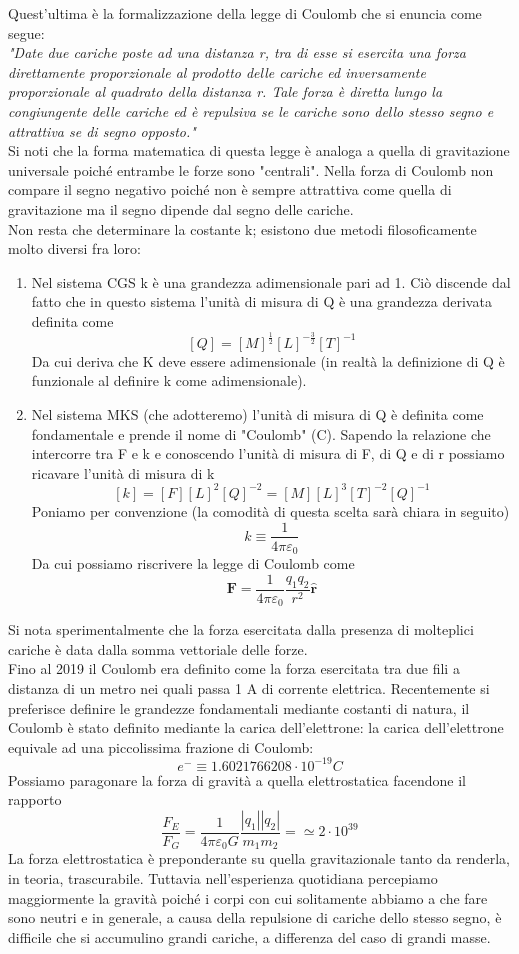 \documentclass[
10pt, %
a4paper, %
oneside, %
headinclude,footinclude, %
BCOR5mm, %
]{scrartcl}
\begin{document}
Quest'ultima è la formalizzazione della legge di Coulomb che si enuncia come segue:\\
\textit{"Date due cariche poste ad una distanza r, tra di esse si esercita una forza direttamente proporzionale al prodotto delle cariche ed inversamente proporzionale al quadrato della distanza r. Tale forza è diretta lungo la congiungente delle cariche ed è repulsiva se le cariche sono dello stesso segno e attrattiva se di segno opposto."}\\
Si noti che la forma matematica di questa legge è analoga a quella di gravitazione universale poiché entrambe le forze sono "centrali". Nella forza di Coulomb non compare il segno negativo poiché non è sempre attrattiva come quella di gravitazione ma il segno dipende dal segno delle cariche.\\
Non resta che determinare la costante k; esistono due metodi filosoficamente molto diversi fra loro:
\begin{enumerate}
	\item Nel sistema CGS  k è una grandezza adimensionale pari ad 1. Ciò discende dal fatto che in questo sistema l'unità di misura di Q è una grandezza derivata definita come
	\[[Q] = [M]^{\frac{1}{2}}[L]^{-\frac{3}{2}}[T]^{-1}\]
	Da cui deriva che K deve essere adimensionale (in realtà la definizione di Q è funzionale al definire k come adimensionale).
	\item Nel sistema MKS (che adotteremo) l'unità di misura di Q è definita come fondamentale e prende il nome di "Coulomb" (C). Sapendo la relazione che intercorre tra F e k e conoscendo l'unità di misura di F, di Q e di r possiamo ricavare l'unità di misura di k
	\[[k] = [F][L]^2[Q]^{-2} = [M][L]^3[T]^{-2}[Q]^{-1}\]
	Poniamo per convenzione (la comodità di questa scelta sarà chiara in seguito)
	\[k \equiv \frac{1}{4\pi\varepsilon_0}\]
	Da cui possiamo riscrivere la legge di Coulomb come
	\[\mathbf{F} = \frac{1}{4\pi\varepsilon_0}\frac{q_1q_2}{r^2}\hat{\mathbf{r}}\]
\end{enumerate}
Si nota sperimentalmente che la forza esercitata dalla presenza di molteplici cariche è data dalla somma vettoriale delle forze.\\
Fino al 2019 il Coulomb era definito come la forza esercitata tra due fili a distanza di un metro nei quali passa 1 A di corrente elettrica. Recentemente si preferisce definire le grandezze fondamentali mediante costanti di natura, il Coulomb è stato definito mediante la carica dell'elettrone: la carica dell'elettrone equivale ad una piccolissima frazione di Coulomb: 
\[e^- \equiv 1.6021766208\cdot10^{-19} C\]
Possiamo paragonare la forza di gravità a quella elettrostatica facendone il rapporto
\[\frac{F_E}{F_G} = \frac{1}{4\pi\varepsilon_0 G}\frac{|q_1||q_2|}{m_1m_2}=\simeq 2\cdot10^{39}\]
La forza elettrostatica è preponderante su quella gravitazionale tanto da renderla, in teoria, trascurabile. Tuttavia nell'esperienza quotidiana percepiamo maggiormente la gravità poiché i corpi con cui solitamente abbiamo a che fare sono neutri e in generale, a causa della repulsione di cariche dello stesso segno, è difficile che si accumulino grandi cariche, a differenza del caso di grandi masse.
\end{document}
